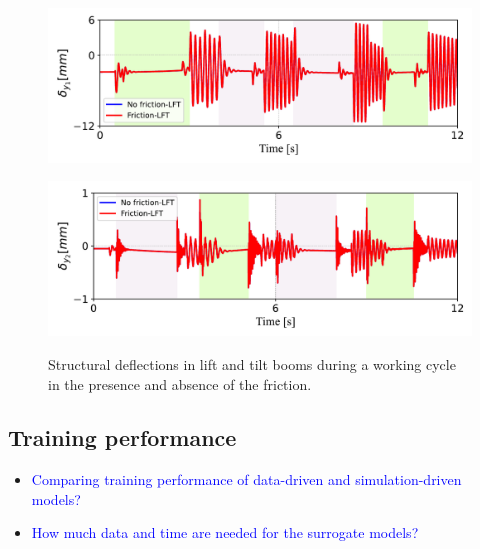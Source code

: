 \begin{figure}[ht]
    \centering
    \begin{minipage}{\textwidth}
        \centering
        \includegraphics[width=\textwidth]{LiftDeflection.pdf}
         \label{LiftDeflection}
    \end{minipage}
    \vspace{1em}  %
    \begin{minipage}{\textwidth}
        \centering
        \includegraphics[width=\textwidth]{TiltDeflection.pdf}
         \label{TiltDeflection}
    \end{minipage}
    \caption{Structural deflections in lift and tilt booms during a working cycle in the presence and absence of the friction.}
    \label{StructuralDeflection}
\end{figure}

\subsection{Training performance}
\begin{itemize}   
    \item \textcolor{blue}{Comparing training performance of data-driven and simulation-driven models?}

    \item \textcolor{blue}{How much data and time are needed for the surrogate models?}
     
\end{itemize}
